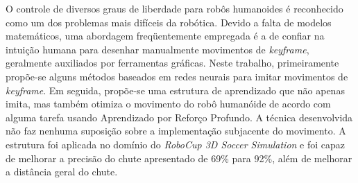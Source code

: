O controle de diversos graus de liberdade para robôs humanoides é reconhecido como um dos problemas mais difíceis da robótica. Devido a falta de modelos matemáticos, uma abordagem freqüentemente empregada é a de confiar na intuição humana para desenhar manualmente movimentos de \textit{keyframe}, geralmente auxiliados por ferramentas gráficas. Neste trabalho, primeiramente propõe-se alguns métodos baseados em redes neurais para imitar movimentos de \textit{keyframe}. Em seguida, propõe-se uma estrutura de aprendizado que não apenas imita, mas também otimiza o movimento do robô humanóide de acordo com alguma tarefa usando Aprendizado por Reforço Profundo. A técnica desenvolvida não faz nenhuma suposição sobre a implementação subjacente do movimento. A estrutura foi aplicada no domínio do \textit{RoboCup 3D Soccer Simulation} e foi capaz de melhorar a precisão do chute apresentado de 69\% para 92\%, além de melhorar a distância geral do chute.